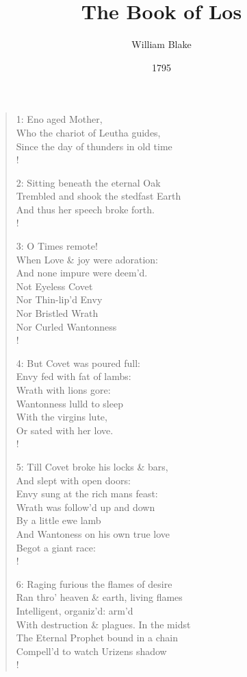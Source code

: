 \documentclass[9pt]{extarticle}
\title{The Book of Los}
\author{William Blake}
\date{1795}
\begin{document}
\maketitle

\begin{verse}
	\begin{altverse} 
		
		1: Eno aged Mother,\\
		Who the chariot of Leutha guides,\\
		Since the day of thunders in old time\\!
		
		2: Sitting beneath the eternal Oak\\
		Trembled and shook the stedfast Earth\\
		And thus her speech broke forth.\\!
		
		3: O Times remote!\\
		When Love \& joy were adoration:\\
		And none impure were deem’d.\\
		Not Eyeless Covet\\
		Nor Thin-lip’d Envy\\
		Nor Bristled Wrath\\
		Nor Curled Wantonness\\!
		
		4: But Covet was poured full:\\
		Envy fed with fat of lambs:\\
		Wrath with lions gore:\\
		Wantonness lulld to sleep\\
		With the virgins lute,\\
		Or sated with her love.\\!
		
		5: Till Covet broke his locks \& bars,\\
		And slept with open doors:\\
		Envy sung at the rich mans feast:\\
		Wrath was follow’d up and down\\
		By a little ewe lamb\\
		And Wantoness on his own true love\\
		Begot a giant race:\\!
		
		6: Raging furious the flames of desire\\
		Ran thro' heaven \& earth, living flames\\
		Intelligent, organiz’d: arm’d\\
		With destruction \& plagues. In the midst\\
		The Eternal Prophet bound in a chain\\
		Compell'd to watch Urizens shadow\\!
		

\end{altverse}
\end{verse}
\end{document}
